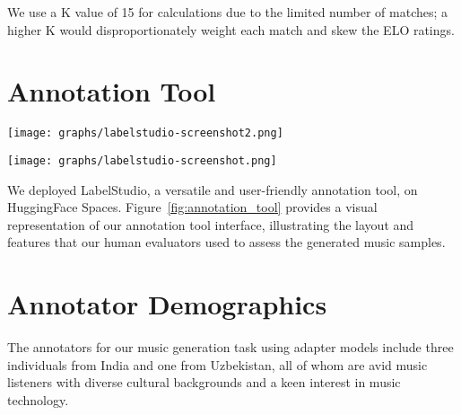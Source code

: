 We use a K value of 15 for calculations due to the limited number of matches; a higher K would disproportionately weight each match and skew the ELO ratings.


\section{Annotation Tool} \label{appendix:annotation_tool}

\begin{figure*}
    \centering
    \begin{minipage}{\textwidth}
        \centering
        \texttt{[image: graphs/labelstudio-screenshot2.png]}
        \label{fig:enter-label-1}
    \end{minipage}
    \vspace{1em}  %
    \begin{minipage}{\textwidth}
        \centering
        \texttt{[image: graphs/labelstudio-screenshot.png]}
        \caption{Screenshots of Label Studio, annotation tool for Inter Annotator Agreement and ELO rating comparison}
        \label{fig:annotation_tool}
    \end{minipage}
\end{figure*}

We deployed LabelStudio, a versatile and user-friendly annotation tool, on HuggingFace Spaces. Figure~\ref{fig:annotation_tool} provides a visual representation of our annotation tool interface, illustrating the layout and features that our human evaluators used to assess the generated music samples.

\section{Annotator Demographics} 
\label{appendix:annotator_demographics}
The annotators for our music generation task using adapter models include three individuals from India and one from Uzbekistan, all of whom are avid music listeners with diverse cultural backgrounds and a keen interest in music technology.

